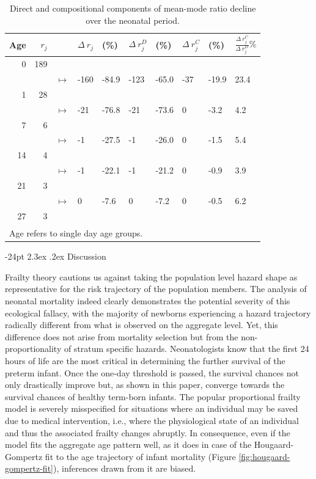 \documentclass[10pt,twoside,reqno]{article}
\makeatletter
\renewcommand\section{\@startsection {section}{1}{\z@}%
                                   {-24pt}%
                                   {2.3ex \@plus.2ex}%
                                   {\normalfont\large\bfseries}}
\makeatother
\begin{document}
\begin{table}
\centering
\caption{\label{tab:tab-memora-change}Direct and compositional components of mean-mode ratio decline over the neonatal period.}
\centering
\begin{tabular}[t]{rrllllllll}
\toprule
Age & $r_j$ &  & $\Delta~r_{j}$ & (\%) & $\Delta~r_{j}^D$ &  (\%) & $\Delta~r_{j}^C$ & (\%) & $\frac{\Delta~r_{j}^C}{\Delta~r_{j}^D}\%$\\
\midrule
0 & 189 &  &  &  &  &  &  &  & \\
 &  & $\mapsto$ & -160 & -84.9 & -123 & -65.0 & -37 & -19.9 & 23.4\\
1 & 28 &  &  &  &  &  &  &  & \\
 &  & $\mapsto$ & -21 & -76.8 & -21 & -73.6 & 0 & -3.2 & 4.2\\
7 & 6 &  &  &  &  &  &  &  & \\
 &  & $\mapsto$ & -1 & -27.5 & -1 & -26.0 & 0 & -1.5 & 5.4\\
14 & 4 &  &  &  &  &  &  &  & \\
 &  & $\mapsto$ & -1 & -22.1 & -1 & -21.2 & 0 & -0.9 & 3.9\\
21 & 3 &  &  &  &  &  &  &  & \\
 &  & $\mapsto$ & 0 & -7.6 & 0 & -7.2 & 0 & -0.5 & 6.2\\
27 & 3 &  &  &  &  &  &  &  & \\
\bottomrule
\multicolumn{10}{l}{\textsuperscript{} Age refers to single day age groups.}\\
\end{tabular}
\end{table}

\section{Discussion}\label{discussion}

Frailty theory cautions us against taking the population level hazard shape as representative for the risk trajectory of the population members. The analysis of neonatal mortality indeed clearly demonstrates the potential severity of this ecological fallacy, with the majority of newborns experiencing a hazard trajectory radically different from what is observed on the aggregate level. Yet, this difference does not arise from mortality selection but from the non-proportionality of stratum specific hazards. Neonatologists know that the first 24 hours of life are the most critical in determining the further survival of the preterm infant. Once the one-day threshold is passed, the survival chances not only drastically improve but, as shown in this paper, converge towards the survival chances of healthy term-born infants. The popular proportional frailty model is severely misspecified for situations where an individual may be saved due to medical intervention, i.e., where the physiological state of an individual and thus the associated frailty changes abruptly. In consequence, even if the model fits the aggregate age pattern well, as it does in case of the Hougaard-Gompertz fit to the age trajectory of infant mortality (Figure \ref{fig:hougaard-gompertz-fit}), inferences drawn from it are biased.
\end{document}
